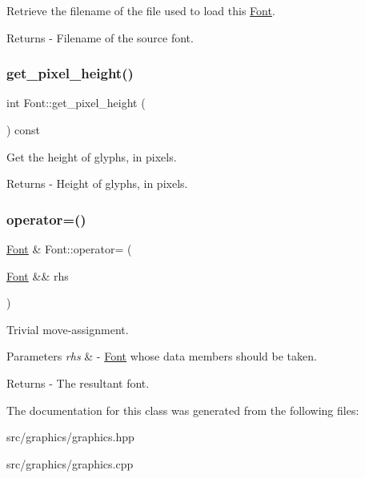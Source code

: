 Retrieve the filename of the file used to load this \mbox{\hyperlink{class_font}{Font}}. \begin{DoxyReturn}{Returns}
-\/ Filename of the source font. 
\end{DoxyReturn}
\mbox{\label{class_font_a8d59ee5734bff61e6de70de065d13260}} 
\subsubsection{\texorpdfstring{get\+\_\+pixel\+\_\+height()}{get\_pixel\_height()}}
{\footnotesize\ttfamily int Font\+::get\+\_\+pixel\+\_\+height (\begin{DoxyParamCaption}{ }\end{DoxyParamCaption}) const}

Get the height of glyphs, in pixels. \begin{DoxyReturn}{Returns}
-\/ Height of glyphs, in pixels. 
\end{DoxyReturn}
\mbox{\label{class_font_afeea92cfdfe189b73a34f074482fe5dd}} 
\subsubsection{\texorpdfstring{operator=()}{operator=()}}
{\footnotesize\ttfamily \mbox{\hyperlink{class_font}{Font}} \& Font\+::operator= (\begin{DoxyParamCaption}\item[{\mbox{\hyperlink{class_font}{Font}} \&\&}]{rhs }\end{DoxyParamCaption})}

Trivial move-\/assignment. 
\begin{DoxyParams}{Parameters}
{\em rhs} & -\/ \mbox{\hyperlink{class_font}{Font}} whose data members should be taken. \\
\hline
\end{DoxyParams}
\begin{DoxyReturn}{Returns}
-\/ The resultant font. 
\end{DoxyReturn}


The documentation for this class was generated from the following files\+:\begin{DoxyCompactItemize}
\item 
src/graphics/graphics.\+hpp\item 
src/graphics/graphics.\+cpp\end{DoxyCompactItemize}
